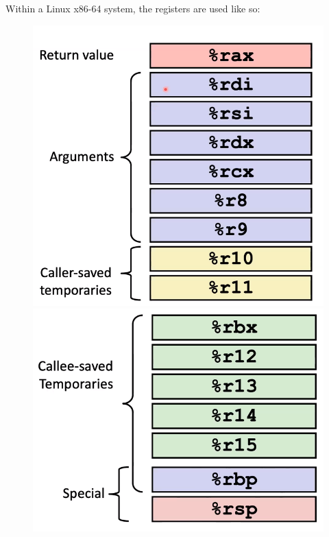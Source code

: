 \documentclass[12pt]{book}
\begin{document}
Within a Linux x86-64 system, the registers
are used like so:
\begin{figure}[h]
        \centering
        \includegraphics[scale = 0.3]{./figures/linuxreg1}
        \includegraphics[scale = 0.3]{./figures/linuxreg2}
\end{figure}
\end{document}
